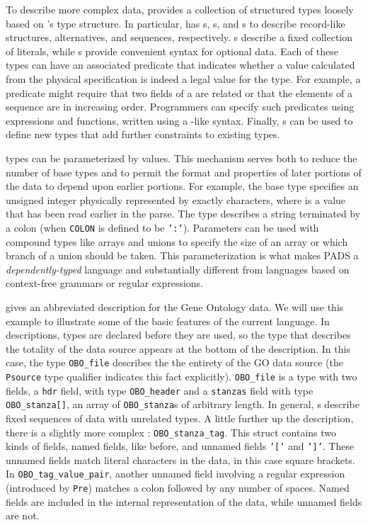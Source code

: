 \documentclass[11pt]{article}
\begin{document}
To describe more complex data, \pads{} provides a collection of
structured types loosely based on \C{}'s type structure.  In
particular, \pads{} has s, s, and s
to describe record-like structures, alternatives, and sequences,
respectively.  s describe a fixed collection of literals,
while s provide convenient syntax for optional data.  Each of
these types can have an associated predicate that indicates whether a
value calculated from the physical specification is indeed a legal
value for the type.  For example, a predicate might require that two
fields of a  are related or that the elements of a
sequence are in increasing order.  Programmers can specify such
predicates using \pads{} expressions and functions, written using a
\C{}-like syntax.  Finally, \pads{} s can be used to
define new types that add further constraints to existing types.

\pads{} types can be parameterized by values.  This mechanism serves
both to reduce the number of base types and to permit the format and
properties of later portions of the data to depend upon earlier
portions.  For example, the base type  specifies
an unsigned integer physically represented by exactly 
characters, where  is a value that has been read earlier in the
parse.  The type  describes a string
terminated by a colon (when \texttt{COLON} is defined to be \texttt{':'}).  
Parameters can be used with compound types like arrays and unions to
specify the size of an array or which branch of a union should be
taken.  This parameterization is what makes PADS a {\em dependently-typed}
language and substantially different from languages based on
context-free grammars or regular expressions.

 gives an abbreviated \pads{} description 
for the Gene Ontology
data.  
We will use this example to illustrate some of the basic
features of the current \pads{} language.  
In \pads{} descriptions, types are declared before they are used, 
so the type that describes the totality of the data source appears 
at the bottom of the description.  In this case,
the type \texttt{OBO\_file} describes the the entirety of the
GO data source (the \texttt{Psource} type qualifier indicates
this fact explicitly).  \texttt{OBO\_file} is a  type with
two fields, a \texttt{hdr} field, with type  \texttt{OBO\_header}
and a \texttt{stanzas} field with type \texttt{OBO\_stanza[]},
an array of \texttt{OBO\_stanza}s of arbitrary length.
In general, s describe fixed sequences of data with 
unrelated types.  A little further up the description, there is
a slightly more complex :  \texttt{OBO\_stanza\_tag}.
This struct contains two kinds of fields, named fields, like
before, and unnamed fields \texttt{'['} and \texttt{']'}.
These unnamed fields match literal characters in the data, in this
case square brackets.  In 
\texttt{OBO\_tag\_value\_pair}, another unnamed field involving 
a regular expression (introduced by \texttt{Pre}) matches a colon
followed by any number of spaces.  Named fields are included in
the internal representation of the data, while unnamed fields are
not.  
\end{document}
